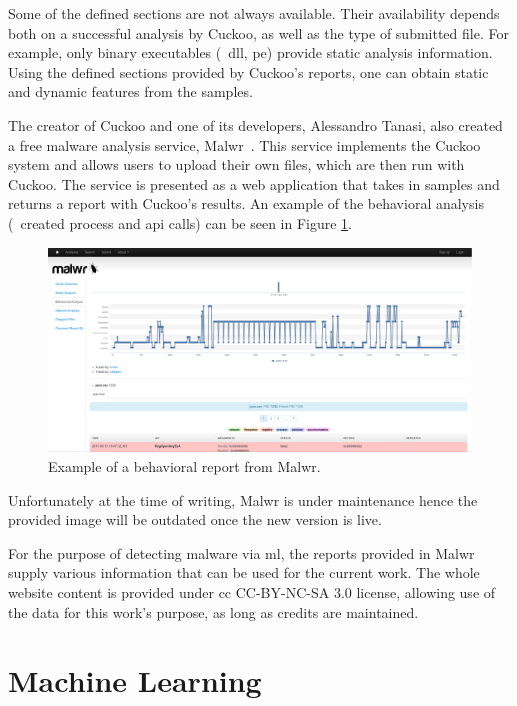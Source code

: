 Some of the defined sections are not always available.
Their availability depends both on a successful analysis by Cuckoo, as well as the type of submitted file.
For example, only binary executables (\eg\ \gls{dll}, \gls{pe}) provide static analysis information.
Using the defined sections provided by Cuckoo's reports, one can obtain static and dynamic features from the samples.

The creator of Cuckoo and one of its developers, Alessandro Tanasi, also created a free malware analysis service, Malwr~\cite{tool:malwr}.
This service implements the Cuckoo system and allows users to upload their own files, which are then run with Cuckoo.
The service is presented as a web application that takes in samples and returns a report with Cuckoo's results.
An example of the behavioral analysis (\ie\ created process and \gls{api} calls) can be seen in Figure \ref{fig:malwr_sample}.

\begin{figure}[!htb]
	\includegraphics[width=\columnwidth]{Figures/malwr_sample.png}
	\caption{Example of a behavioral report from Malwr.}
	\label{fig:malwr_sample}
\end{figure}

Unfortunately at the time of writing, Malwr is under maintenance hence the provided image will be outdated once the new version is live.

For the purpose of detecting malware via \gls{ml}, the reports provided in Malwr supply various information that can be used for the current work.
The whole website content is provided under \gls{cc} CC-BY-NC-SA 3.0\cite{cc-by-nc-sa} license, allowing use of the data for this work's purpose, as long as credits are maintained.

\section{Machine Learning}
\label{section:ml}

